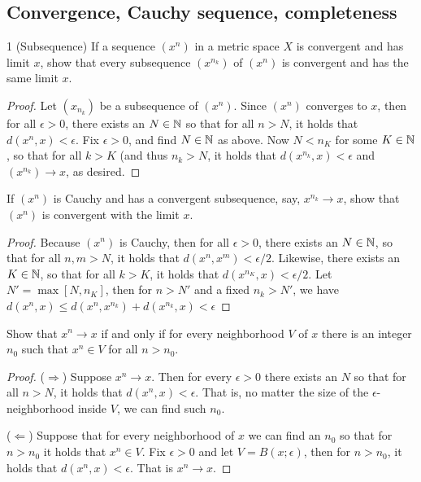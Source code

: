 \subsection{Convergence, Cauchy sequence, completeness}

\begin{exercise}{1 (Subsequence)}
If a sequence $(x^n)$ in a metric space $X$ is convergent and has limit $x$, show that every subsequence $(x^{n_k})$ of $(x^n)$ is convergent and has the same limit $x$.
\end{exercise}
\begin{proof}
Let $(x_{n_k})$ be a subsequence of $(x^n)$. Since $(x^n)$ converges to $x$, then for all $\epsilon>0$, there exists an $N\in\mathbb{N}$ so that for all $n>N$, it holds that $d(x^n,x)<\epsilon$. Fix $\epsilon>0$, and find $N\in\mathbb{N}$ as above. Now $N<n_K$ for some $K\in\mathbb{N}$, so that for all $k>K$ (and thus $n_k>N$, it holds that $d(x^{n_k},x)<\epsilon$ and $(x^{n_k})\to x$, as desired.
\end{proof}

\begin{exercise}{2}
If $(x^n)$ is Cauchy and has a convergent subsequence, say, $x^{n_k}\to x$, show that $(x^n)$ is convergent with the limit $x$.
\end{exercise}
\begin{proof}
Because $(x^n)$ is Cauchy, then for all $\epsilon>0$, there exists an $N\in\mathbb{N}$, so that for all $n,m>N$, it holds that $d(x^n,x^m)<\epsilon/2$. Likewise, there exists an $K\in\mathbb{N}$, so that for all $k>K$, it holds that $d(x^{n_K},x)<\epsilon/2$. Let $N'=\max[N,n_K]$, then for $n>N'$ and a fixed $n_k>N'$, we have $d(x^n,x)\leq d(x^n,x^{n_k})+d(x^{n_k},x)<\epsilon$
\end{proof}

\begin{exercise}{3}
Show that $x^n\to x$ if and only if for every neighborhood $V$ of $x$ there is an integer $n_0$ such that $x^n\in V$ for all $n>n_0$.
\end{exercise}
\begin{proof}
($\Rightarrow$) Suppose $x^n\to x$. Then for every $\epsilon>0$ there exists an $N$ so that for all $n>N$, it holds that $d(x^n,x)<\epsilon$. That is, no matter the size of the $\epsilon$-neighborhood inside $V$, we can find such $n_0$.

($\Leftarrow$) Suppose that for every neighborhood of $x$ we can find an $n_0$ so that for $n>n_0$ it holds that $x^n\in V$. Fix $\epsilon>0$ and let $V=B(x;\epsilon)$, then for $n>n_0$, it holds that $d(x^n,x)<\epsilon$. That is $x^n\to x$.
\end{proof}

